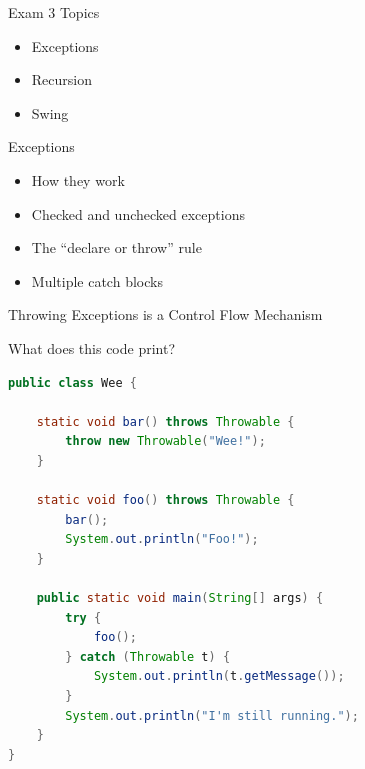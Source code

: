 \documentclass{beamer}
\author[Chris Simpkins] 
{Christopher Simpkins \\\texttt{chris.simpkins@gatech.edu}}
\institute[Georgia Tech] %
\date[CS 1331]{}
\begin{document}
\begin{frame}
  \titlepage
\end{frame}

\begin{frame}[fragile]{Exam 3 Topics}


\begin{itemize}
\item Exceptions
\item Recursion
\item Swing
\end{itemize}


\end{frame}

\begin{frame}[fragile]{Exceptions}

\begin{itemize}
\item How they work
\item Checked and unchecked exceptions
\item The ``declare or throw'' rule
\item Multiple catch blocks
\end{itemize}


\end{frame}

\begin{frame}[fragile]{Throwing Exceptions is a Control Flow Mechanism}


What does this code print?
\begin{lstlisting}[language=Java]
public class Wee {

    static void bar() throws Throwable {
        throw new Throwable("Wee!");
    }

    static void foo() throws Throwable {
        bar();
        System.out.println("Foo!");
    }

    public static void main(String[] args) {
        try {        
            foo();
        } catch (Throwable t) {
            System.out.println(t.getMessage());
        }
        System.out.println("I'm still running.");
    }
}
\end{lstlisting}

\end{frame}
\end{document}
